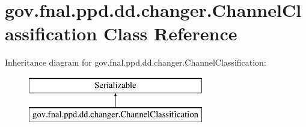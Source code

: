 \hypertarget{classgov_1_1fnal_1_1ppd_1_1dd_1_1changer_1_1ChannelClassification}{\section{gov.\-fnal.\-ppd.\-dd.\-changer.\-Channel\-Classification Class Reference}
\label{classgov_1_1fnal_1_1ppd_1_1dd_1_1changer_1_1ChannelClassification}
}
Inheritance diagram for gov.\-fnal.\-ppd.\-dd.\-changer.\-Channel\-Classification\-:\begin{figure}[H]
\begin{center}
\leavevmode
\includegraphics[height=2.000000cm]{classgov_1_1fnal_1_1ppd_1_1dd_1_1changer_1_1ChannelClassification}
\end{center}
\end{figure}
